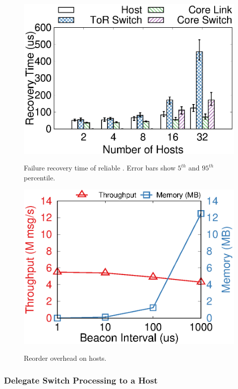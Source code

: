 \begin{figure}[t]
\begin{minipage}[]{.32\textwidth}
		\centering
		\includegraphics[width=\textwidth]{gnuplot/failure_recovery.eps}
		\vspace{-15pt}
		\caption{Failure recovery time of reliable \sys{}. Error bars show $5^{th}$ and $95^{th}$ percentile.}
		\label{fig:failure-recovery}
		\includegraphics[width=\textwidth]{gnuplot/reorder_receiver.eps}
		\vspace{-15pt}
		\caption{Reorder overhead on hosts.}
		\label{fig:reorder-overhead}
		\vspace{-10pt}
	\end{minipage}
	\vspace{-10pt}
\end{figure}


\subsubsection{Delegate Switch Processing to a Host}
\label{sec:end-host}

